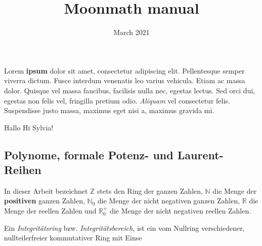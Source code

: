 \documentclass{article}
\title{Moonmath manual}
\author{}
\date{March 2021}
\begin{document}
\maketitle

Lorem \textbf{ipsum} dolor sit amet, consectetur adipiscing elit. Pellentesque semper viverra dictum.  Fusce interdum venenatis leo varius vehicula. Etiam ac massa dolor. Quisque vel massa faucibus, facilisis nulla nec, egestas lectus. Sed orci dui, egestas non felis vel, fringilla pretium odio. \textit{Aliquam} vel consectetur felis. Suspendisse justo massa, maximus eget nisi a, maximus gravida mi.

Hallo
Hi Sylvia!



\subsection{Polynome, formale Potenz- und Laurent-Reihen}
In dieser Arbeit bezeichnet $\mathbb{Z}$ stets den Ring der ganzen Zahlen, $\mathbb{N}$ die Menge der \textbf{positiven} ganzen Zahlen, 
$\mathbb{N}_0$ die Menge der nicht negativen ganzen Zahlen, 
$\mathbb{R}$ die Menge der reellen Zahlen und $\mathbb{R}^+_0$ die Menge
der nicht negativen reellen Zahlen.

Ein \textit{Integritätsring} bzw. \textit{Integritätsbereich}, ist ein vom Nullring verschiedener, nullteilerfreier kommutativer Ring mit Einse
\end{document}
